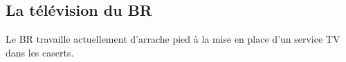 
\subsection{La télévision du BR}
\label{TV}
Le BR travaille actuellement d'arrache pied à la mise en place d'un service TV dans les caserts.








